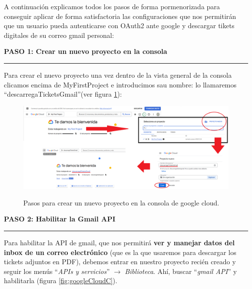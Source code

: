 \documentclass[a4paper,12pt]{report}
\begin{document}
	A continuación explicamos todos los pasos de forma pormenorizada para conseguir aplicar de forma satisfactoria las configuraciones que nos permitirán que un usuario pueda autenticarse con OAuth2 ante google y descargar tikets digitales de su correo gmail personal:
	
	
	\noindent \textbf{PASO 1: Crear un nuevo proyecto en la consola}
	\vspace{.2em}
	\hrule
	\vspace{.5em}
	
	Para crear  el nuevo proyecto una vez dentro de la vista general de la consola clicamos encima de MyFirstProject e introducimos sau nombre: lo llamaremos ``descarregaTicketsGmail''(ver figura \ref{fig:googleCloudA}):
	
	\FloatBarrier
	\setlength{\belowcaptionskip}{3pt}
	\begin{figure}[H]
		\centering
		\caption{Pasos para crear un nuevo proyecto en la consola de google cloud.}
		\includegraphics[width=1\linewidth]{img/googleCloudA.png}
		\label{fig:googleCloudA}
	\end{figure}
	\FloatBarrier
	
	
	
	
	
	
	
	
	
	
	
	
	
	\noindent \textbf{PASO 2: Habilitar la Gmail API}
	\vspace{.2em}
	\hrule
	\vspace{.5em}
	
	Para habilitar la API de gmail, que nos permitirá \textbf{ver y manejar datos del inbox de un correo electrónico} (que es la que usaremos para descargar los tickets adjuntos en PDF), debemos entrar en nuestro proyecto recién creado y seguir los menús ``\textit{APIs y servicios}'' $\rightarrow$ \textit{Biblioteca}. Ahí, buscar ``\textit{gmail API}'' y habilitarla (figura \ref{fig:googleCloudC}).
	
\end{document}
